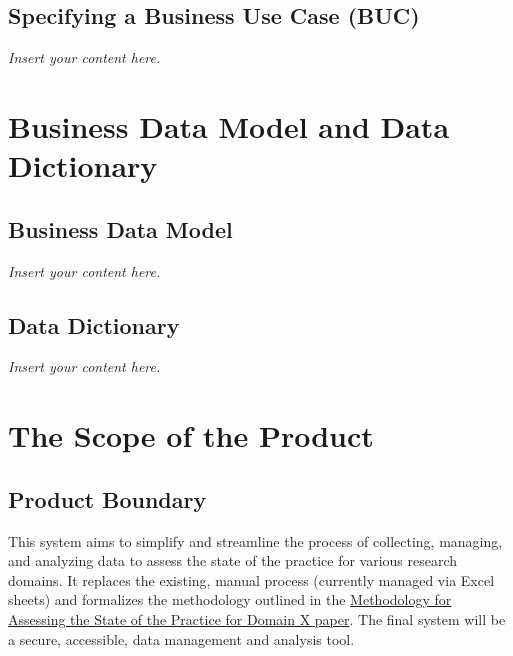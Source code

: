 \documentclass[12pt]{article}
\newcommand{\lips}{\textit{Insert your content here.}}
\begin{document}
\subsection{Specifying a Business Use Case (BUC)}
\lips

\section{Business Data Model and Data Dictionary}
\subsection{Business Data Model}
\lips
\subsection{Data Dictionary}
\lips

\section{The Scope of the Product}
\subsection{Product Boundary}
This system aims to simplify and streamline the process of collecting, managing, and analyzing data to assess the state of the practice for various research domains. It replaces the existing, manual process (currently managed via Excel sheets) and formalizes the methodology outlined in the \href{https://arxiv.org/abs/2110.11575}{Methodology for Assessing the State of the Practice for Domain X paper}. The final system will be a secure, accessible, data management and analysis tool.
\end{document}
